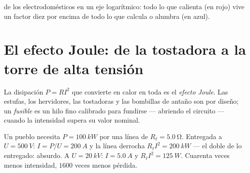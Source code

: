 \begin{omfigure}

{\small {} de los electrodomésticos en un eje logarítmico: todo
lo que calienta (en rojo) vive un factor diez por encima de todo lo que
calcula o alumbra (en azul).}
\end{omfigure}

\section{El efecto Joule: de la tostadora a la torre de alta tensión}

\begin{definition}\label{def:g11:circuits-and-power:joule}
La disipación $P = RI^2$ que convierte  en calor en
toda  es el \emph{efecto Joule}. Las
estufas, los hervidores, las tostadoras y las bombillas de antaño son
 por diseño; un \emph{fusible} es un hilo
fino calibrado para fundirse --- abriendo el circuito --- cuando la
intensidad supera su valor nominal.
\end{definition}

\begin{example}\label{ex:g11:circuits-and-power:transmission}
Un pueblo necesita $P = \qty{100}{kW}$ por una línea de 
$R_\ell = \qty{5.0}{\ohm}$. Entregada a $U = \qty{500}{V}$:
$I = P/U = \qty{200}{A}$ y la línea derrocha
$R_\ell I^2 = \qty{200}{kW}$ --- el doble de lo entregado: absurdo. A
$U = \qty{20}{kV}$: $I = \qty{5.0}{A}$ y $R_\ell I^2 = \qty{125}{W}$.
Cuarenta veces menos intensidad, $1600$ veces menos pérdida.
\end{example}

